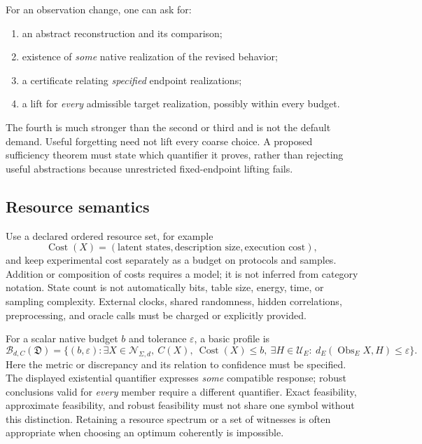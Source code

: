 \documentclass[11pt]{article}
\theoremstyle{remark}
\newcommand{\Obs}{\operatorname{Obs}}
\newcommand{\Cost}{\operatorname{Cost}}
\newcommand{\calN}{\mathcal N}
\newcommand{\calU}{\mathcal U}
\begin{document}
For an observation change, one can ask for:
\begin{enumerate}
\item an abstract reconstruction and its comparison;
\item existence of \emph{some} native realization of the revised behavior;
\item a certificate relating \emph{specified} endpoint realizations;
\item a lift for \emph{every} admissible target realization, possibly within every budget.
\end{enumerate}
The fourth is much stronger than the second or third and is not the default demand. Useful forgetting need not lift every coarse choice. A proposed sufficiency theorem must state which quantifier it proves, rather than rejecting useful abstractions because unrestricted fixed-endpoint lifting fails.

\subsection{Resource semantics}

Use a declared ordered resource set, for example
\[
 \Cost(X)=(\text{latent states},\text{description size},\text{execution cost}),
\]
and keep experimental cost separately as a budget on protocols and samples. Addition or composition of costs requires a model; it is not inferred from category notation. State count is not automatically bits, table size, energy, time, or sampling complexity. External clocks, shared randomness, hidden correlations, preprocessing, and oracle calls must be charged or explicitly provided.

For a scalar native budget $b$ and tolerance $\varepsilon$, a basic profile is
\begin{equation}
 \mathscr B_{d,C}(\mathfrak D)
 =\{(b,\varepsilon):\exists X\in\calN_{\Sigma,d},\ C(X),\
 \Cost(X)\leq b,\ \exists H\in\calU_E:\ d_E(\Obs_E X,H)\leq\varepsilon\}.
 \label{eq:budget-profile}
\end{equation}
Here the metric or discrepancy and its relation to confidence must be specified. The displayed existential quantifier expresses \emph{some} compatible response; robust conclusions valid for \emph{every} member require a different quantifier. Exact feasibility, approximate feasibility, and robust feasibility must not share one symbol without this distinction. Retaining a resource spectrum or a set of witnesses is often appropriate when choosing an optimum coherently is impossible.
\end{document}

